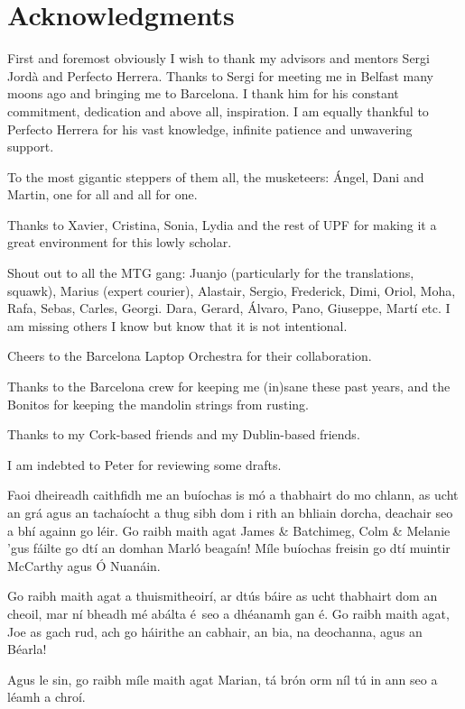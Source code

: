 \chapter*{Acknowledgments}

First and foremost obviously I wish to thank my advisors and mentors Sergi Jordà and Perfecto Herrera. Thanks to Sergi for meeting me in Belfast many moons ago and bringing me to Barcelona. I thank him for his constant commitment, dedication and above all, inspiration. I am equally thankful to Perfecto Herrera for his vast knowledge, infinite patience and unwavering support. 

To the most gigantic steppers of them all, the musketeers: Ángel, Dani and Martin, one for all and all for one.

Thanks to Xavier, Cristina, Sonia, Lydia and the rest of UPF for making it a great environment for this lowly scholar.

Shout out to all the MTG gang: Juanjo (particularly for the translations, squawk), Marius (expert courier), Alastair, Sergio, Frederick, Dimi, Oriol, Moha, Rafa, Sebas, Carles, Georgi. Dara, Gerard, Álvaro, Pano, Giuseppe, Martí etc. I am missing others I know but know that it is not intentional. 

Cheers to the Barcelona Laptop Orchestra for their collaboration.

Thanks to the Barcelona crew for keeping me (in)sane these past years, and the Bonitos for keeping the mandolin strings from rusting.

Thanks to my Cork-based friends and my Dublin-based friends.

I am indebted to Peter for reviewing some drafts.

Faoi dheireadh caithfidh me an buíochas is mó a thabhairt do mo chlann, as ucht an grá agus an  tachaíocht a thug sibh dom i rith an bhliain dorcha, deachair seo a bhí againn go léir. Go raibh maith agat James \& Batchimeg, Colm \& Melanie 'gus fáilte go dtí an domhan Marló beagaín! Míle buíochas freisin go dtí muintir McCarthy agus Ó Nuanáin.

Go raibh maith agat a thuismitheoirí, ar dtús báire as ucht thabhairt dom an cheoil, mar ní bheadh mé abálta é seo a dhéanamh gan é. Go raibh maith agat, Joe as gach rud, ach go háirithe an cabhair, an bia, na deochanna, agus an Béarla!

Agus le sin, go raibh míle maith agat Marian, tá brón orm níl tú in ann seo a léamh a chroí.
%
%
\normalsize